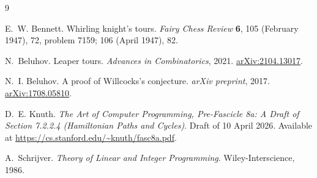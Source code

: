 \documentclass[11pt]{article}
\theoremstyle{plain}
\theoremstyle{remark}
\begin{document}
\begin{thebibliography}{9}

E.~W. Bennett.
\newblock Whirling knight's tours.
\newblock \emph{Fairy Chess Review} \textbf{6}, 105 (February 1947),
72, problem 7159;  106 (April 1947), 82.

N.~Beluhov.
\newblock Leaper tours.
\newblock \emph{Advances in Combinatorics}, 2021.
\newblock \href{https://arxiv.org/abs/2104.13017}{arXiv:2104.13017}.

N.~I. Beluhov.
\newblock A proof of Willcocks's conjecture.
\newblock \emph{arXiv preprint}, 2017.
\newblock \href{https://arxiv.org/abs/1708.05810}{arXiv:1708.05810}.

D.~E. Knuth.
\newblock \emph{The Art of Computer Programming, Pre-Fascicle 8a:
A Draft of Section 7.2.2.4 (Hamiltonian Paths and Cycles)}.
\newblock Draft of 10 April 2026.
\newblock Available at
\url{https://cs.stanford.edu/~knuth/fasc8a.pdf}.

A.~Schrijver.
\newblock \emph{Theory of Linear and Integer Programming}.
\newblock Wiley-Interscience, 1986.

\end{thebibliography}
\end{document}
